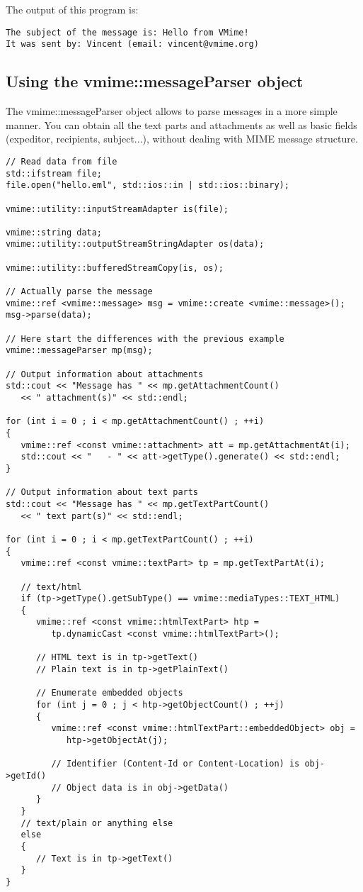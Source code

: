 The output of this program is:

\begin{verbatim}
The subject of the message is: Hello from VMime!
It was sent by: Vincent (email: vincent@vmime.org)
\end{verbatim}


\subsection{Using the {\vcode vmime::messageParser} object} %

The {\vcode vmime::messageParser} object allows to parse messages in a more
simple manner. You can obtain all the text parts and attachments as well as
basic fields (expeditor, recipients, subject...), without dealing with
MIME message structure.

\begin{lstlisting}[caption={Using {\vcode vmime::messageParser} to parse
more complex messages}]
// Read data from file
std::ifstream file;
file.open("hello.eml", std::ios::in | std::ios::binary);

vmime::utility::inputStreamAdapter is(file);

vmime::string data;
vmime::utility::outputStreamStringAdapter os(data);

vmime::utility::bufferedStreamCopy(is, os);

// Actually parse the message
vmime::ref <vmime::message> msg = vmime::create <vmime::message>();
msg->parse(data);

// Here start the differences with the previous example
vmime::messageParser mp(msg);

// Output information about attachments
std::cout << "Message has " << mp.getAttachmentCount()
   << " attachment(s)" << std::endl;

for (int i = 0 ; i < mp.getAttachmentCount() ; ++i)
{
   vmime::ref <const vmime::attachment> att = mp.getAttachmentAt(i);
   std::cout << "   - " << att->getType().generate() << std::endl;
}

// Output information about text parts
std::cout << "Message has " << mp.getTextPartCount()
   << " text part(s)" << std::endl;

for (int i = 0 ; i < mp.getTextPartCount() ; ++i)
{
   vmime::ref <const vmime::textPart> tp = mp.getTextPartAt(i);

   // text/html
   if (tp->getType().getSubType() == vmime::mediaTypes::TEXT_HTML)
   {
      vmime::ref <const vmime::htmlTextPart> htp =
         tp.dynamicCast <const vmime::htmlTextPart>();

      // HTML text is in tp->getText()
      // Plain text is in tp->getPlainText()

      // Enumerate embedded objects
      for (int j = 0 ; j < htp->getObjectCount() ; ++j)
      {
         vmime::ref <const vmime::htmlTextPart::embeddedObject> obj =
            htp->getObjectAt(j);

         // Identifier (Content-Id or Content-Location) is obj->getId()
         // Object data is in obj->getData()
      }
   }
   // text/plain or anything else
   else
   {
      // Text is in tp->getText()
   }
}
\end{lstlisting}


